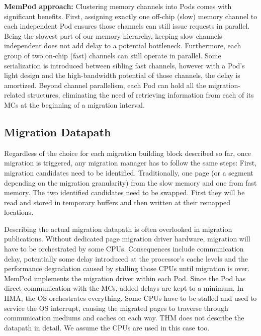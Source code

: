 	\textbf{MemPod approach:} Clustering memory channels into Pods comes with significant benefits. First, assigning exactly one off-chip (slow) memory channel to each independent Pod ensures those channels can still issue requests in parallel. Being the slowest part of our memory hierarchy, keeping slow channels independent does not add delay to a potential bottleneck. Furthermore, each group of two on-chip (fast) channels can still operate in parallel. Some serialization is introduced between sibling fast channels, however with a Pod's light design and the high-bandwidth potential of those channels, the delay is amortized. Beyond channel parallelism, each Pod can hold all the migration-related structures, eliminating the need of retrieving information from each of its MCs at the beginning of a migration interval. 

\subsection{Migration Datapath}
Regardless of the choice for each migration building block described so far, once migration is triggered, any migration manager has to follow the same steps: First, migration candidates need to be identified. Traditionally, one page (or a segment depending on the migration granularity) from the slow memory and one from fast memory. The two identified candidates need to be swapped. First they will be read and stored in temporary buffers and then written at their remapped locations. 

Describing the actual migration datapath is often overlooked in migration publications. Without dedicated page migration driver hardware, migration will have to be orchestrated by some CPUs. Consequences include communication delay, potentially some delay introduced at the processor's cache levels and the performance degradation caused by stalling those CPUs until migration is over. MemPod implements the migration driver within each Pod. Since the Pod has direct communication with the MCs, added delays are kept to a minimum. In HMA, the OS orchestrates everything. Some CPUs have to be stalled and used to service the OS interrupt, causing the migrated pages to traverse through communication mediums and caches on each way. THM does not describe the datapath in detail. We assume the CPUs are used in this case too.

